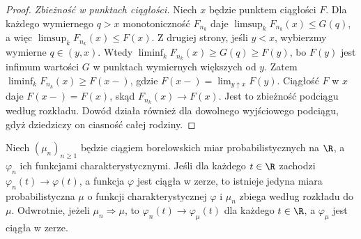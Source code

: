 \begin{proof}
\emph{Zbieżność w punktach ciągłości.}
Niech $x$ będzie punktem ciągłości $F$.
Dla każdego wymiernego $q>x$ monotoniczność
$F_{n_k}$ daje
$\limsup_kF_{n_k}(x)\leq G(q)$, a więc
$\limsup_kF_{n_k}(x)\leq F(x)$.
Z drugiej strony, jeśli $y<x$, wybierzmy
wymierne $q\in(y,x)$. Wtedy
$\liminf_kF_{n_k}(x)\geq G(q)\geq F(y)$,
bo $F(y)$ jest infimum wartości $G$ w punktach
wymiernych większych od $y$. Zatem
$\liminf_kF_{n_k}(x)\geq F(x-)$, gdzie
$F(x-)=\lim_{y\uparrow x}F(y)$.
Ciągłość $F$ w $x$ daje $F(x-)=F(x)$, skąd
$F_{n_k}(x)\to F(x)$. Jest to zbieżność
podciągu według rozkładu. Dowód działa również
dla dowolnego wyjściowego podciągu, gdyż dziedziczy
on ciasność całej rodziny.
\end{proof}

\begin{twierdzenie}
Niech $(\mu_n)_{n\geq1}$ będzie ciągiem borelowskich miar
probabilistycznych na $\R$, a $\varphi_n$ ich
funkcjami charakterystycznymi. Jeśli dla każdego
$t\in\R$ zachodzi $\varphi_n(t)\to\varphi(t)$,
a funkcja $\varphi$ jest ciągła w zerze, to istnieje
jedyna miara probabilistyczna $\mu$ o funkcji
charakterystycznej $\varphi$ i $\mu_n$ zbiega
według rozkładu do $\mu$.
Odwrotnie, jeżeli $\mu_n\Rightarrow\mu$, to
$\varphi_n(t)\to\varphi_\mu(t)$ dla każdego $t\in\R$,
a $\varphi_\mu$ jest ciągła w zerze.
\end{twierdzenie}
